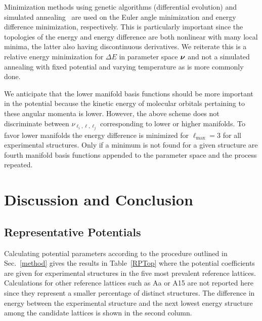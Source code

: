 \documentclass[preprint]{revtex4}
\newcommand{\mb}[1]{\ensuremath{\mbox{\boldmath $ #1 $}}}
\begin{document}
Minimization methods using genetic algorithms (differential
evolution) and simulated annealing~\cite{Kirkpatrick83} are used on
the Euler angle minimization and energy difference minimization,
respectively. This is particularly important since the topologies of
the energy and energy difference are both nonlinear with many local
minima, the latter also having discontinuous derivatives. We
reiterate this is a relative energy minimization for $\Delta E$ in
parameter space $\mb{\nu}$ and not a simulated annealing with fixed
potential and varying temperature as is more commonly done.

We anticipate that the lower manifold basis functions should be more
important in the potential because the kinetic energy of molecular
orbitals pertaining to these angular momenta is lower. However, the
above scheme does not discriminate between
$\nu_{\ell_i,\ell,\ell_j}$ corresponding to lower or higher
manifolds.  To favor lower manifolds the energy difference is
minimized for $\ell_{\mathrm{max}}=3$ for all experimental
structures. Only if a minimum is not found for a given structure are
fourth manifold basis functions appended to the parameter space and
the process repeated.


\section{Discussion and Conclusion}
\label{discussion}

\subsection{Representative Potentials}
\label{representative_potentials}

Calculating potential parameters according to the procedure outlined
in Sec.~\ref{method} gives the results in Table~\ref{RPTop} where
the potential coefficients are given for experimental structures in
the five most prevalent reference lattices. Calculations for other
reference lattices such as Aa or A15 are not reported here since
they represent a smaller percentage of distinct structures. The
difference in energy between the experimental structure and the next
lowest energy structure among the candidate lattices is shown in the
second column.
\end{document}
